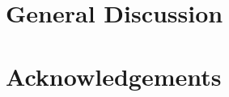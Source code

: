 \documentclass[10pt,letterpaper]{article}
\begin{document}
\section{General Discussion}

\section{Acknowledgements}




\setlength{\bibleftmargin}{.125in}
\setlength{\bibindent}{-\bibleftmargin}


\end{document}
